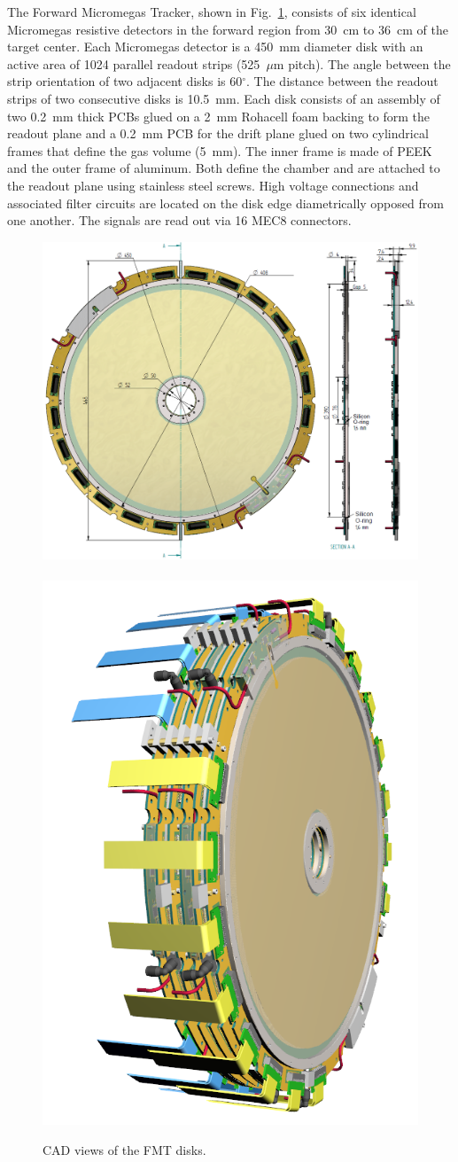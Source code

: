 The Forward Micromegas Tracker, shown in Fig.~\ref{fig:mm-fig5}, consists of six identical Micromegas resistive detectors in
the forward region from 30~cm to 36~cm of the target center. Each Micromegas detector is a 450~mm diameter disk with an
active area of 1024 parallel readout strips (525~$\mu$m pitch). The angle between the strip orientation of two adjacent disks
is 60$^\circ$. The distance between the readout strips of two consecutive disks is 10.5~mm.  Each disk consists of an assembly
of two 0.2~mm thick PCBs glued on a 2~mm Rohacell foam backing to form the readout plane and a 0.2~mm PCB for the drift plane
glued on two cylindrical frames that define the gas volume (5~mm). The inner frame is made of PEEK and the outer frame of
aluminum. Both define the chamber and are attached to the readout plane using stainless steel screws. High voltage connections
and associated filter circuits are located on the disk edge diametrically opposed from one another. The signals are read out via
16 MEC8 connectors. 

\begin{figure}[htb]
 
\includegraphics[width=0.66\columnwidth,keepaspectratio]{images/fig6_1}~\includegraphics[width=0.33\columnwidth,
keepaspectratio]{images/fig6_2}
 \caption{CAD views of the FMT disks.}
 \label{fig:mm-fig5}
\end{figure}


